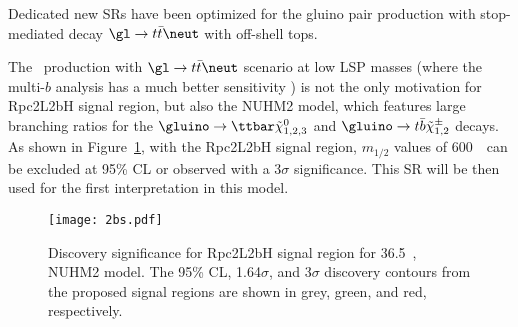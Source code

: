 

Dedicated new SRs have been optimized for the gluino pair production with stop-mediated decay $\gl\to t\bar t\neut$ with off-shell tops.

The \glgl\ production with $\gl\to t\bar t\neut$ scenario at low LSP masses (where the multi-$b$ analysis has a much better sensitivity
\cite{ATLAS-CONF-2017-021}) is not the only motivation for Rpc2L2bH signal region, but also the NUHM2 model, which features large branching ratios for the $\gluino\to\ttbar\tilde{\chi}_{1,2,3}^0$ and $\gluino\to t\bar{b}\tilde{\chi}_{1,2}^\pm$ decays. 
As shown in Figure~\ref{fig:SR_nuhm}, with the Rpc2L2bH signal region,  $m_{1/2}$ values of 600~\GeV~can be excluded at 95\% CL or observed with a 3$\sigma$ significance.
This SR will be then used for the first interpretation in this model.

\begin{figure}[t]
\centering
\texttt{[image: 2bs.pdf]}
\caption{Discovery significance for Rpc2L2bH signal region for 36.5~\ifb, NUHM2 model. The 95\% CL, 1.64$\sigma$, and 3$\sigma$ discovery contours from the proposed signal regions are shown in grey, green, and red, respectively.
}
\label{fig:SR_nuhm}
\end{figure}


